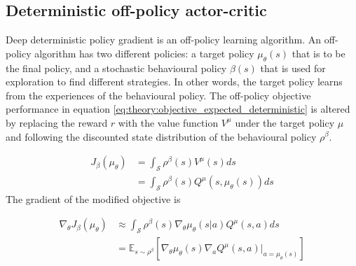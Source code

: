 \documentclass[class=book, crop=false]{standalone}
\begin{document}
\subsection{Deterministic off-policy actor-critic}
Deep deterministic policy gradient is an off-policy learning algorithm. An off-policy algorithm has two different policies: a target policy $\mu_{\theta}(s)$ that is to be the final policy, and a stochastic behavioural policy $\beta(s)$ that is used for exploration to find different strategies. In other words, the target policy learns from the experiences of the behavioural policy. The off-policy objective performance in equation \eqref{eq:theory:objective_expected_deterministic} is altered by replacing the reward $r$ with the value function $V^{\mu}$ under the target policy $\mu$ and following the discounted state distribution of the behavioural policy $\rho^{\beta}$.

\begin{equation}
   \begin{aligned}\label{eq:theory:objective_expected_ooff_policy}
    J_{\beta}(\mu_{\theta}) &=
    \int_{\mathcal{S}}
    \rho^{\beta}(s)V^{\mu}(s) ds 
    \\
    &=
    \int_{\mathcal{S}}
    \rho^{\beta}(s)Q^{\mu}(s,\mu_{\theta}(s)) ds
\end{aligned} 
\end{equation}
The gradient of the modified objective is

\begin{equation}
   \begin{aligned}\label{eq:theory:objective_gradient_deterministic_off_policy}
    \nabla_{\theta}J_{\beta}(\mu_{\theta}) &\approx
    \int_{\mathcal{S}}
    \rho^{\beta}(s)
    \nabla_{\theta} \mu_{\theta}(s|a)
    Q^{\mu}(s,a)ds 
    \\
    &= \mathbb{E}_{s\sim \rho^{\beta}}
    [\nabla_{\theta} \mu_{\theta}(s)
    \nabla_{a} Q^{\mu}(s,a)|_{a = \mu_{\theta}(s)}]
\end{aligned} 
\end{equation}
\end{document}
